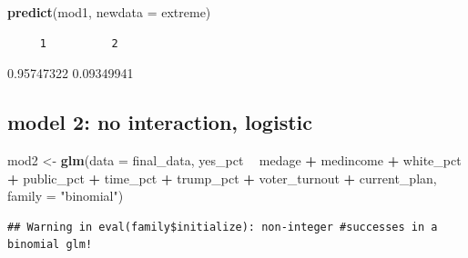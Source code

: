 \documentclass[
]{article}
\newenvironment{Shaded}{\begin{snugshade}}{\end{snugshade}}
\newcommand{\DataTypeTok}[1]{\textcolor[rgb]{0.13,0.29,0.53}{#1}}
\newcommand{\KeywordTok}[1]{\textcolor[rgb]{0.13,0.29,0.53}{\textbf{#1}}}
\newcommand{\NormalTok}[1]{#1}
\newcommand{\OperatorTok}[1]{\textcolor[rgb]{0.81,0.36,0.00}{\textbf{#1}}}
\newcommand{\StringTok}[1]{\textcolor[rgb]{0.31,0.60,0.02}{#1}}
\begin{document}
\begin{Shaded}
\end{Shaded}

\begin{Shaded}
\begin{Highlighting}[]
\KeywordTok{predict}\NormalTok{(mod1, }\DataTypeTok{newdata =}\NormalTok{ extreme)}
\end{Highlighting}
\end{Shaded}

\begin{verbatim}
     1          2 
\end{verbatim}

0.95747322 0.09349941

\hypertarget{model-2-no-interaction-logistic}{%
\subsection{model 2: no interaction,
logistic}\label{model-2-no-interaction-logistic}}

\begin{Shaded}
\begin{Highlighting}[]
\NormalTok{mod2 <-}\StringTok{ }\KeywordTok{glm}\NormalTok{(}\DataTypeTok{data =}\NormalTok{ final_data, yes_pct }\OperatorTok{~}\StringTok{ }\NormalTok{medage }\OperatorTok{+}\StringTok{ }\NormalTok{medincome }\OperatorTok{+}\StringTok{ }\NormalTok{white_pct }\OperatorTok{+}\StringTok{ }\NormalTok{public_pct }\OperatorTok{+}\StringTok{ }\NormalTok{time_pct }\OperatorTok{+}\StringTok{ }\NormalTok{trump_pct }\OperatorTok{+}\StringTok{ }\NormalTok{voter_turnout }\OperatorTok{+}\StringTok{ }\NormalTok{current_plan, }\DataTypeTok{family =} \StringTok{"binomial"}\NormalTok{)}
\end{Highlighting}
\end{Shaded}

\begin{verbatim}
## Warning in eval(family$initialize): non-integer #successes in a binomial glm!
\end{verbatim}
\end{document}
